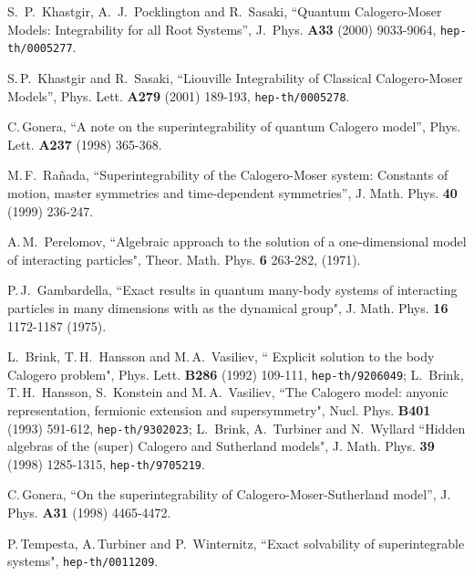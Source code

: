 \documentclass[a4paper,12pt]{article}
\begin{document}
\begin{thebibliography}{99}
S.\, P.\, Khastgir, A.\, J.\, Pocklington and R.\, Sasaki,
``Quantum Calogero-Moser Models: Integrability for all Root Systems'',
J.\ Phys. {\bf A33} (2000) 9033-9064,
{\tt hep-th/0005277}.



S.\,P.\, Khastgir and R.\, Sasaki,
``Liouville Integrability of Classical Calogero-Moser Models'',
Phys. Lett. {\bf A279} (2001) 189-193,
{\tt hep-th/0005278}.

C.\,Gonera,
``A note on the superintegrability of quantum Calogero model'',
 Phys. Lett. {\bf A237} (1998) 365-368.


M.\,F.\, Ra\~{n}ada,
``Superintegrability of the Calogero-Moser system:
Constants of motion, master symmetries and time-dependent symmetries'',
J. Math. Phys. {\bf 40} (1999) 236-247.


A.\,M.\, Perelomov, ``Algebraic approach to the solution of a
one-dimensional model of interacting particles",
Theor. Math. Phys. {\bf 6} 263-282, (1971).

P.\,J.\, Gambardella, ``Exact results in quantum many-body systems of
interacting particles in many dimensions with \coordHE{} as the
dynamical group",
J. Math. Phys. {\bf 16} 1172-1187 (1975).

L.\, Brink, T.\,H.\, Hansson and M.\,A.\, Vasiliev, `` Explicit solution
to
the \coordHE{} body Calogero problem", Phys. Lett. {\bf B286} (1992) 109-111,
{\tt hep-th/9206049};
L.\, Brink, T.\,H.\, Hansson, S.\, Konstein and M.\,A.\, Vasiliev,
``The Calogero model: anyonic representation, fermionic extension and
supersymmetry", Nucl. Phys. {\bf B401} (1993) 591-612,
{\tt hep-th/9302023};
L.\, Brink, A.\, Turbiner and N.\, Wyllard ``Hidden algebras of the
(super) Calogero and Sutherland models", J. Math. Phys. {\bf 39} (1998)
1285-1315,  {\tt hep-th/9705219}.



C.\,Gonera,
``On the superintegrability of Calogero-Moser-Sutherland model'',
J. Phys. {\bf A31} (1998) 4465-4472.

P.\,Tempesta, A.\,Turbiner and P.\, Winternitz,
``Exact solvability of superintegrable systems",
{\tt hep-th/0011209}.

\end{thebibliography}
\end{document}
